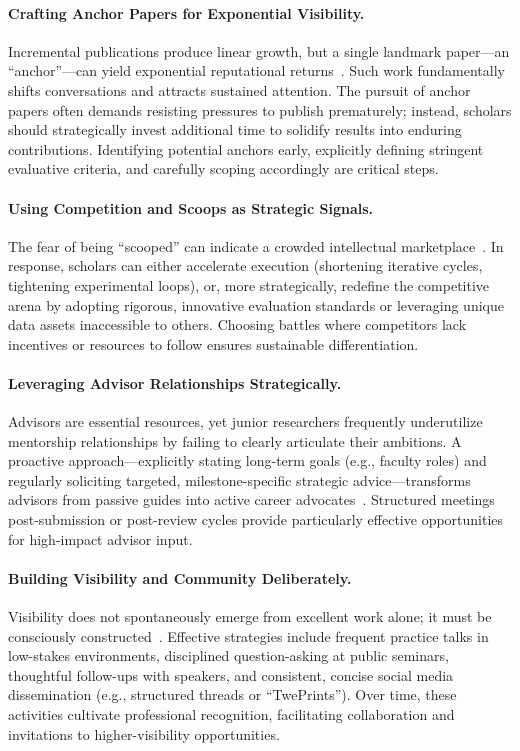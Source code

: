 \paragraph{Crafting Anchor Papers for Exponential Visibility.}
Incremental publications produce linear growth, but a single landmark paper---an ``anchor''---can yield exponential reputational returns~\citep{bhattad2025jrgrads}.
Such work fundamentally shifts conversations and attracts sustained attention.
The pursuit of anchor papers often demands resisting pressures to publish prematurely; instead, scholars should strategically invest additional time to solidify results into enduring contributions.
Identifying potential anchors early, explicitly defining stringent evaluative criteria, and carefully scoping accordingly are critical steps.

\paragraph{Using Competition and Scoops as Strategic Signals.}
The fear of being ``scooped'' can indicate a crowded intellectual marketplace~\citep{bhattad2025jrgrads}.
In response, scholars can either accelerate execution (shortening iterative cycles, tightening experimental loops), or, more strategically, redefine the competitive arena by adopting rigorous, innovative evaluation standards or leveraging unique data assets inaccessible to others.
Choosing battles where competitors lack incentives or resources to follow ensures sustainable differentiation.

\paragraph{Leveraging Advisor Relationships Strategically.}
Advisors are essential resources, yet junior researchers frequently underutilize mentorship relationships by failing to clearly articulate their ambitions.
A proactive approach---explicitly stating long-term goals (e.g., faculty roles) and regularly soliciting targeted, milestone-specific strategic advice---transforms advisors from passive guides into active career advocates~\citep{bhattad2025jrgrads}.
Structured meetings post-submission or post-review cycles provide particularly effective opportunities for high-impact advisor input.

\paragraph{Building Visibility and Community Deliberately.}
Visibility does not spontaneously emerge from excellent work alone; it must be consciously constructed~\citep{bhattad2025jrgrads}.
Effective strategies include frequent practice talks in low-stakes environments, disciplined question-asking at public seminars, thoughtful follow-ups with speakers, and consistent, concise social media dissemination (e.g., structured threads or ``TwePrints'').
Over time, these activities cultivate professional recognition, facilitating collaboration and invitations to higher-visibility opportunities.


